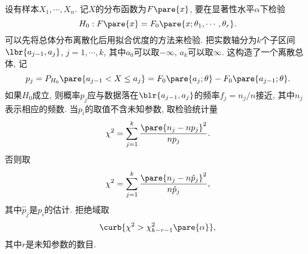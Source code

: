 \documentclass[../Statistics.tex]{subfiles}
\begin{document}
设有样本$X_1,\cdots,X_n$. 记$X$的分布函数为$F\pare{x}$, 要在显著性水平$\alpha$下检验
\[ H_0: F\pare{x} = F_0\pare{x;\theta_1,\cdots,\theta_r}. \]
可以先将总体分布离散化后用拟合优度的方法来检验. 把实数轴分为$k$个子区间$\lbr{a_{j-1},a_j}$, $j=1,\cdots,k$, 其中$a_0$可以取$-\infty$, $a_k$可以取$\infty$. 这构造了一个离散总体, 记
\[ p_j = P_{H_0}\pare{a_{j-1} < X \le a_j} = F_0\pare{a_j;\theta} - F_0\pare{a_{j-1};\theta}. \]
如果$H_0$成立, 则概率$p_j$应与数据落在$\blr{a_{j-1},a_j}$的频率$f_j = n_j/n$接近, 其中$n_j$表示相应的频数. 当$p_i$的取值不含未知参数, 取检验统计量
\[ \chi^2 = \sum_{j=1}^k \frac{\pare{n_j - np_j}^2}{np_j}. \]
否则取
\[ \chi^2 = \sum_{j=1}^k \frac{\pare{n_j - n\hat p_j}^2}{n\hat p_j}, \]
其中$\hat p_j$是$p_i$的估计. 拒绝域取
\[ \curb{\chi^2 > \chi^2_{k-r-1}\pare{\alpha}}, \]
其中$r$是未知参数的数目.
\begin{sample}
\end{sample}



\end{document}
